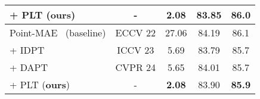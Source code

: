 \begin{table}[t]
\begin{tabular}{lcccc}
    \rowcolor{linecolor!40}+ PLT (\textbf{ours})& - & \textbf{2.08}  & \textbf{83.85} & \textbf{86.0} \\
    \midrule
    Point-MAE~\cite{pang2022masked} (baseline) &  ECCV 22 & 27.06 & 84.19 & 86.1 \\ 
    + IDPT~\cite{zha2023instance} & ICCV 23 & 5.69  & 83.79  & 85.7  \\
    + DAPT~\cite{zhou2024dynamic} & CVPR 24 & 5.65  & 84.01 & 85.7 \\
    \rowcolor{linecolor!40}+ PLT (\textbf{ours})& - & \textbf{2.08}  & 83.90 & \textbf{85.9} \\
    \bottomrule
    \end{tabular}
  \label{tab:segmentation}
\end{table}